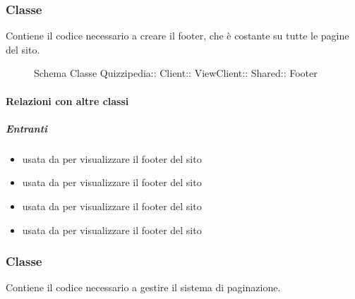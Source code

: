 \subsubsection{Classe }
Contiene il codice necessario a creare il footer, che è costante su tutte le pagine del sito.
\begin{figure}[H]
\centering
\noindent{}
\caption[Schema Classe Footer]{Schema Classe Quizzipedia:: Client:: ViewClient:: Shared:: Footer}
\end{figure}
\paragraph{Relazioni con altre classi}
\subparagraph{Entranti}
\begin{itemize}
\item usata da  per visualizzare il footer del sito
\item usata da  per visualizzare il footer del sito
\item usata da  per visualizzare il footer del sito
\item usata da  per visualizzare il footer del sito
\end{itemize}
\subsubsection{Classe }
Contiene il codice necessario a gestire il sistema di paginazione.
